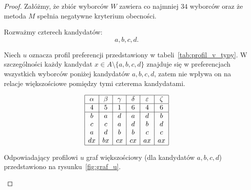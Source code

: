 \documentclass[12pt,a4paper]{mwrep}
\begin{document}
	\begin{proof}
		Załóżmy, że zbiór wyborców \(W\) zawiera co najmniej \(34\) wyborców oraz że metoda \(M\) spełnia negatywne kryterium obecności.
		
		Rozważmy czterech kandydatów:
		\[
		a,b,c,d.
		\]
		
		Niech \(u\) oznacza profil preferencji przedstawiony w tabeli~\ref{tab:profil_v_typy}. W szczególności każdy kandydat \(x \in A \setminus \{a,b,c,d\}\) znajduje się w preferencjach wszystkich wyborców poniżej kandydatów \(a,b,c,d\), zatem nie wpływa on na relacje większościowe pomiędzy tymi czterema kandydatami.
		
		\begin{table}[H]
			\centering
			\[
			\begin{array}{|c|c|c|c|c|c|}
				\hline
				\alpha & \beta & \gamma & \delta & \varepsilon & \zeta \\
				\hline
				4 & 5 & 1 & 6 & 4 & 6 \\
				\hline
				b & a & d & a & d & b \\
				c & c & a & d & b & d \\
				a & d & b & b & c & c \\
				dx & bx & cx & cx & ax & ax \\
				\hline
			\end{array}
			\]
			\caption{Profil preferencji $R^W$}
			\label{tab:profil_v_typy}
		\end{table}
		
		Odpowiadający profilowi \(u\) graf większościowy (dla kandydatów \(a,b,c,d\)) przedstawiono na rysunku~\ref{fig:graf_u}.
		
		\begin{figure}[H]
			\centering
			
\end{figure}
\end{proof}
\end{document}
